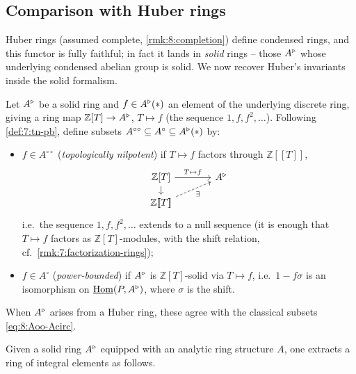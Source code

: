 \subsection{Comparison with Huber rings}

Huber rings (assumed complete, \cref{rmk:8:completion}) define condensed rings,
and this functor is fully faithful; in fact it lands in \emph{solid} rings --
those $A^{\triangleright}$ whose underlying condensed abelian group is solid. We now recover
Huber's invariants inside the solid formalism.

\begin{definition}
\label{def:8:tn-pb-solid}
Let $A^{\triangleright}$ be a solid ring and $f\in A^{\triangleright}(\ast)$ an element of the underlying
discrete ring, giving a ring map $\mathbb{Z}[T]\to A^{\triangleright}$, $T\mapsto f$ (the
sequence $1,f,f^{2},\dots$). Following \cref{def:7:tn-pb}, define subsets
$A^{\circ\circ}\subseteq A^{\circ}\subseteq A^{\triangleright}(\ast)$ by:
\begin{itemize}
\item $f\in A^{\circ\circ}$ (\emph{topologically nilpotent}) if $T\mapsto f$
factors through $\mathbb{Z}[\![T]\!]$,
\begin{equation*}
\begin{tikzcd}[column sep=large, row sep=small]
\mathbb{Z}[T]\arrow[r, "T\mapsto f"]\arrow[d] & \ur A \\
\mathbb{Z}[\![T]\!]\arrow[ur, dashed, "\exists"'] &
\end{tikzcd}
\end{equation*}
i.e.\ the sequence $1,f,f^{2},\dots$ extends to a null sequence (it is enough that
$T\mapsto f$ factors as $\mathbb{Z}[T]$-modules, with the shift relation, cf.\
\cref{rmk:7:factorization-rings});
\item $f\in A^{\circ}$ (\emph{power-bounded}) if $A^{\triangleright}$ is $\mathbb{Z}[T]$-solid
via $T\mapsto f$, i.e.\ $1-f\sigma$ is an isomorphism on $\underline{\operatorname{Hom}}(P,A^{\triangleright})$, where
$\sigma$ is the shift.
\end{itemize}
When $A^{\triangleright}$ arises from a Huber ring, these agree with the classical subsets
\eqref{eq:8:Aoo-Acirc}.
\end{definition}

Given a solid ring $A^{\triangleright}$ equipped with an analytic ring structure $A$, one
extracts a ring of integral elements as follows.


